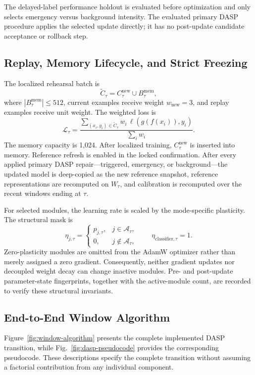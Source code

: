 \documentclass{ieeeaccess}
\begin{document}
The delayed-label performance holdout is evaluated before optimization and only selects emergency versus background intensity. The evaluated primary DASP procedure applies the selected update directly; it has no post-update candidate acceptance or rollback step.

\subsection{Replay, Memory Lifecycle, and Strict Freezing}
The localized rehearsal batch is
\begin{equation}
\widetilde C_{\tau}=C_{\tau}^{\mathrm{new}}\cup B_{\tau}^{\mathrm{mem}},
\label{eq:rehearsal}
\end{equation}
where $|B_{\tau}^{\mathrm{mem}}|\leq512$, current examples receive weight $w_{\mathrm{new}}=3$, and replay examples receive unit weight. The weighted loss is
\begin{equation}
\mathcal{L}_{\tau}=\frac{\sum_{(x_i,y_i)\in\widetilde C_{\tau}}w_i\,
\ell(g(f(x_i)),y_i)}{\sum_i w_i}.
\label{eq:loss}
\end{equation}
The memory capacity is 1,024. After localized training, $C_{\tau}^{\mathrm{new}}$ is inserted into memory. Reference refresh is enabled in the locked confirmation. After every applied primary DASP repair---triggered, emergency, or background---the updated model is deep-copied as the new reference snapshot, reference representations are recomputed on $W_{\tau}$, and calibration is recomputed over the recent windows ending at $\tau$.

For selected modules, the learning rate is scaled by the mode-specific plasticity. The structural mask is
\begin{equation}
\eta_{j,\tau}=\begin{cases}
p_{j,\tau}, & j\in\mathcal A_{\tau},\\
0, & j\notin\mathcal A_{\tau},
\end{cases}
\qquad \eta_{\mathrm{classifier},\tau}=1.
\label{eq:mask}
\end{equation}
Zero-plasticity modules are omitted from the AdamW optimizer rather than merely assigned a zero gradient. Consequently, neither gradient updates nor decoupled weight decay can change inactive modules. Pre- and post-update parameter-state fingerprints, together with the active-module count, are recorded to verify these structural invariants.
\subsection{End-to-End Window Algorithm}
Figure~\ref{fig:window-algorithm} presents the complete implemented DASP transition, while Fig.~\ref{fig:dasp-pseudocode} provides the corresponding pseudocode. These descriptions specify the complete transition without assuming a factorial contribution from any individual component.
\end{document}
